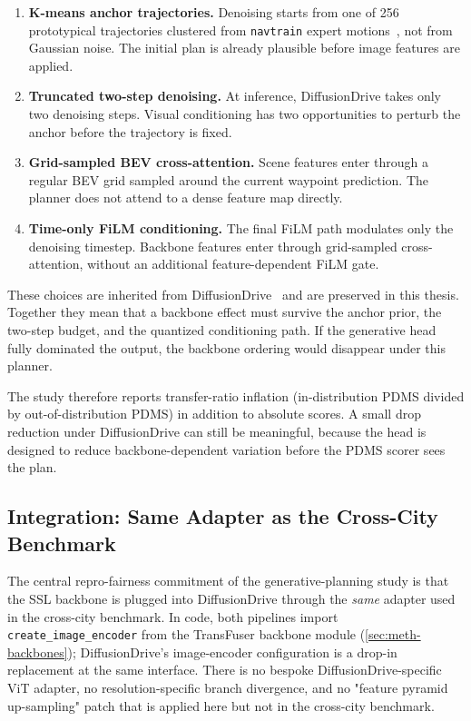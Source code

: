 \begin{enumerate}
    \item \textbf{K-means anchor trajectories.} Denoising starts from one of 256 prototypical trajectories clustered from \texttt{navtrain} expert motions~\cite{jia-diffusiondrive-2025}, not from Gaussian noise. The initial plan is already plausible before image features are applied.
    \item \textbf{Truncated two-step denoising.} At inference, DiffusionDrive takes only two denoising steps. Visual conditioning has two opportunities to perturb the anchor before the trajectory is fixed.
    \item \textbf{Grid-sampled BEV cross-attention.} Scene features enter through a regular BEV grid sampled around the current waypoint prediction. The planner does not attend to a dense feature map directly.
    \item \textbf{Time-only FiLM conditioning.} The final FiLM path modulates only the denoising timestep. Backbone features enter through grid-sampled cross-attention, without an additional feature-dependent FiLM gate.
\end{enumerate}

These choices are inherited from DiffusionDrive~\cite{jia-diffusiondrive-2025} and are preserved in this thesis. Together they mean that a backbone effect must survive the anchor prior, the two-step budget, and the quantized conditioning path. If the generative head fully dominated the output, the backbone ordering would disappear under this planner.

The study therefore reports transfer-ratio inflation (in-distribution PDMS divided by out-of-distribution PDMS) in addition to absolute scores. A small drop reduction under DiffusionDrive can still be meaningful, because the head is designed to reduce backbone-dependent variation before the PDMS scorer sees the plan.

\subsection{Integration: Same Adapter as the Cross-City Benchmark}
\label{sec:meth-dd-ssl}

The central repro-fairness commitment of the generative-planning study is that the SSL backbone is plugged into DiffusionDrive through the \emph{same} adapter used in the cross-city benchmark. In code, both pipelines import \texttt{create\_image\_encoder} from the TransFuser backbone module (\ref{sec:meth-backbones}); DiffusionDrive's image-encoder configuration is a drop-in replacement at the same interface. There is no bespoke DiffusionDrive-specific ViT adapter, no resolution-specific branch divergence, and no "feature pyramid up-sampling" patch that is applied here but not in the cross-city benchmark.

